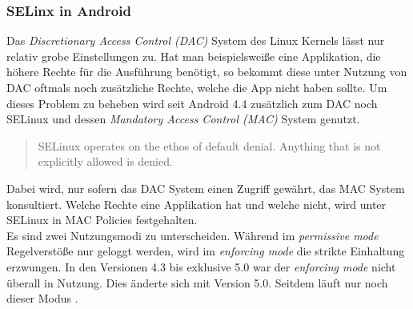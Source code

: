 	\subsubsection{SELinx in Android}
	Das \textit{Discretionary Access Control (DAC)} System des Linux Kernels lässt nur relativ grobe Einstellungen zu. Hat man beispielsweiße eine Applikation, die höhere Rechte für die Ausführung benötigt, so bekommt diese unter Nutzung von DAC oftmals noch zusätzliche Rechte, welche die App nicht haben sollte.	Um dieses Problem zu beheben wird seit Android 4.4 zusätzlich zum DAC noch SELinux und dessen \textit{Mandatory Access Control (MAC)} System genutzt.
	\begin{quote}
	SELinux operates on the ethos of default denial. Anything that is not explicitly allowed is denied. \cite{SELinuxAndroid}
	\end{quote}
\begin{flushleft}
	Dabei wird, nur sofern das DAC System einen Zugriff gewährt, das MAC System konsultiert. Welche Rechte eine Applikation hat und welche nicht, wird unter SELinux in MAC Policies festgehalten.\\
	
	Es sind zwei Nutzungsmodi zu unterscheiden. Während im \textit{permissive mode} Regelverstöße nur geloggt werden, wird im \textit{enforcing mode} die strikte Einhaltung erzwungen. In den Versionen 4.3 bis exklusive 5.0 war der \textit{enforcing mode} nicht überall in Nutzung. Dies änderte sich mit Version 5.0. Seitdem läuft nur noch dieser Modus \cite{SELinuxAndroid}.
\end{flushleft}
	
	
	
	
